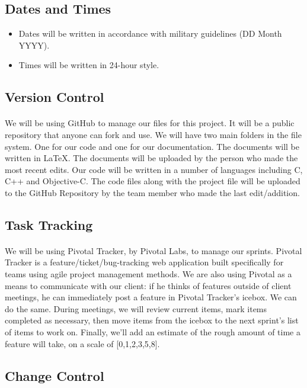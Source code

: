 \subsection{Dates and Times}
\begin{itemize}
\item Dates will be written in accordance with military guidelines (DD Month YYYY).
\item Times will be written in 24-hour style.
\end{itemize}
\subsection{Version Control}
\paragraph{} We will be using GitHub to manage our files for this project. It will be a public repository that anyone can fork and use. We will have two main folders in the file system. One for our code and one for our documentation. The documents will be written in \LaTeX. The documents will be uploaded by the person who made the most recent edits. Our code will be written in a number of languages including C, C++ and Objective-C. The code files along with the project file will be uploaded to the GitHub Repository by the team member who made the last edit/addition.
\subsection{Task Tracking}
\paragraph{} We will be using Pivotal Tracker, by Pivotal Labs, to manage our sprints. Pivotal Tracker is a feature/ticket/bug-tracking web application built specifically for teams using agile project management methods. We are also using Pivotal as a means to communicate with our client: if he thinks of features outside of client meetings, he can immediately post a feature in Pivotal Tracker’s icebox. We can do the same. During meetings, we will review current items, mark items completed as necessary, then move items from the icebox to the next sprint’s list of items to work on. Finally, we’ll add an estimate of the rough amount of time a feature will take, on a scale of [0,1,2,3,5,8]. 

\subsection{Change Control}

